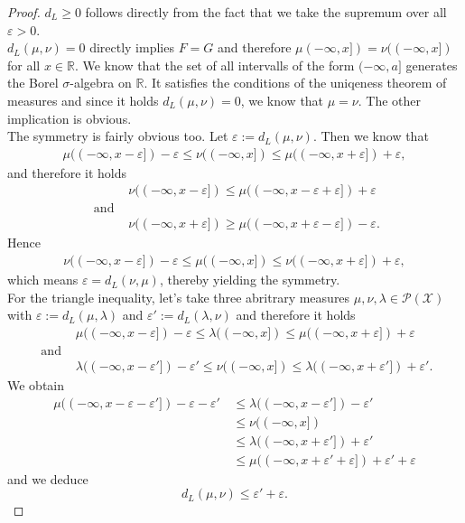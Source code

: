 \documentclass[11pt,a4paper]{article}
\begin{document}
\begin{proof}
$d_L\geq{}0$ follows directly from the fact that we take the supremum over all $\varepsilon>0$.\\
$d_L(\mu,\nu)=0$ directly implies $F=G$ and therefore $\mu(-\infty,x]) = \nu((-\infty,x])$ for all $x\in\mathbb{R}$. We know that the set of all intervalls of the form $(-\infty,a]$ generates the Borel $\sigma$-algebra on $\mathbb{R}$. It satisfies the conditions of the uniqeness theorem of measures and since it holds $d_L(\mu,\nu)=0$, we know that $\mu=\nu$. The other implication is obvious.\vspace{1em}\\
The symmetry is fairly obvious too. Let $\varepsilon:=d_L(\mu,\nu)$. Then we know that 
\begin{align*}
\mu((-\infty,x-\varepsilon])-\varepsilon \leq \nu((-\infty,x]) \leq \mu((-\infty,x+\varepsilon])+\varepsilon,
\end{align*}  
and therefore it holds 
\begin{align*}
&\nu((-\infty,x-\varepsilon]) \leq \mu((-\infty,x-\varepsilon+\varepsilon])+\varepsilon \\ \text{ and }& \\&\nu((-\infty,x+\varepsilon]) \geq \mu((-\infty,x+\varepsilon-\varepsilon])-\varepsilon.
\end{align*}
Hence
\begin{align*}
\nu((-\infty,x-\varepsilon])-\varepsilon \leq \mu((-\infty,x]) \leq \nu((-\infty,x+\varepsilon])+\varepsilon,
\end{align*}
which means $\varepsilon=d_L(\nu,\mu)$, thereby yielding the symmetry.\vspace{1em}\\
For the triangle inequality, let's take three abritrary measures $\mu,\nu,\lambda\in\mathcal{P(X)}$ with $\varepsilon:=d_L(\mu,\lambda)$ and $\varepsilon':=d_L(\lambda,\nu)$ and therefore it holds
\begin{align*}
&\mu((-\infty,x-\varepsilon])-\varepsilon \leq \lambda((-\infty,x]) \leq \mu((-\infty,x+\varepsilon])+\varepsilon
\\\text{ and }& \\
&\lambda((-\infty,x-\varepsilon'])-\varepsilon' \leq \nu((-\infty,x]) \leq \lambda((-\infty,x+\varepsilon'])+\varepsilon'.
\end{align*}
We obtain
\begin{align*}
\mu((-\infty,x-\varepsilon-\varepsilon'])-\varepsilon-\varepsilon' \,&\leq \lambda((-\infty,x-\varepsilon'])-\varepsilon' \\[5pt]&\leq \nu((-\infty,x]) \\[5pt]&\leq \lambda((-\infty,x+\varepsilon'])+\varepsilon' \\[5pt]&\leq \mu((-\infty,x+\varepsilon'+\varepsilon])+\varepsilon'+\varepsilon
\end{align*}
and we deduce
\[
d_L(\mu,\nu)\leq\varepsilon'+\varepsilon.
\]
\end{proof}
\end{document}
